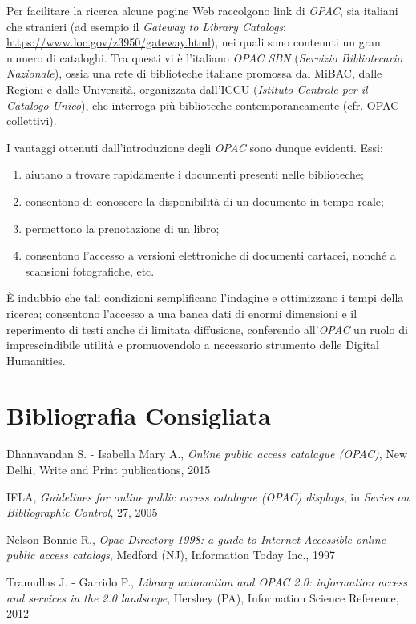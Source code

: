 Per facilitare la ricerca alcune pagine Web raccolgono link di
\emph{OPAC}, sia italiani che stranieri (ad esempio il \emph{Gateway to
Library Catalogs}:
\url{https://www.loc.gov/z3950/gateway.html}),
nei quali sono contenuti un gran numero di cataloghi. Tra questi vi è
l'italiano \emph{OPAC SBN} (\emph{Servizio Bibliotecario Nazionale}),
ossia una rete di biblioteche italiane promossa dal MiBAC, dalle Regioni
e dalle Università, organizzata dall'ICCU (\emph{Istituto Centrale per
il Catalogo Unico}), che interroga più biblioteche contemporaneamente
(cfr. OPAC collettivi).

I vantaggi ottenuti dall'introduzione degli \emph{OPAC} sono dunque
evidenti. Essi:

\begin{enumerate}
\def\labelenumi{\arabic{enumi}.}
\item
  aiutano a trovare rapidamente i documenti presenti nelle biblioteche;
\item
  consentono di conoscere la disponibilità di un documento in tempo
  reale;
\item
  permettono la prenotazione di un libro;
\item
  consentono l'accesso a versioni elettroniche di documenti cartacei,
  nonché a scansioni fotografiche, etc.
\end{enumerate}

È indubbio che tali condizioni semplificano l'indagine e ottimizzano i
tempi della ricerca; consentono l'accesso a una banca dati di enormi
dimensioni e il reperimento di testi anche di limitata diffusione,
conferendo all'\emph{OPAC} un ruolo di imprescindibile utilità e
promuovendolo a necessario strumento delle Digital Humanities.

\section*{Bibliografia Consigliata}
{\parindent0pt 
Dhanavandan S. - Isabella Mary A., \emph{Online public access catalague
(OPAC)}, New Delhi, Write and Print publications, 2015

IFLA, \emph{Guidelines for online public access catalogue (OPAC)
displays}, in \emph{Series on Bibliographic Control}, 27, 2005

Nelson Bonnie R., \emph{Opac Directory 1998: a guide to
Internet-Accessible online public access catalogs}, Medford (NJ),
Information Today Inc., 1997

Tramullas J. - Garrido P., \emph{Library automation and OPAC 2.0:
information access and services in the 2.0 landscape}, Hershey (PA),
Information Science Reference, 2012
}

